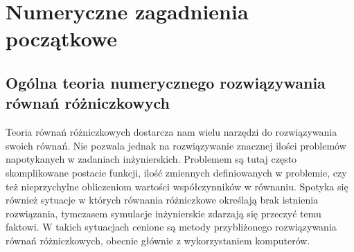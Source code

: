 \documentclass[12pt,a4paper]{report}
\begin{document}

\chapter{Numeryczne zagadnienia początkowe}

\section{Ogólna teoria numerycznego rozwiązywania równań różniczkowych}

Teoria równań różniczkowych dostarcza nam wielu narzędzi do rozwiązywania swoich równań. Nie pozwala jednak na rozwiązywanie znacznej ilości problemów napotykanych w zadaniach inżynierskich. Problemem są tutaj często skomplikowane postacie funkcji, ilość zmiennych definiowanych w problemie, czy też nieprzychylne obliczeniom wartości współczynników w równaniu. Spotyka się również sytuacje w których równania różniczkowe określają brak istnienia rozwiązania, tymczasem symulacje inżynierskie zdarzają się przeczyć temu faktowi. W takich sytuacjach cenione są metody przybliżonego rozwiązywania równań różniczkowych, obecnie głównie z wykorzystaniem komputerów. 
\end{document}
